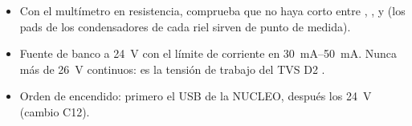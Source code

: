 \begin{ojo}
\begin{itemize}
  \item Con el multímetro en resistencia, comprueba que no haya corto entre , ,  y
   (los pads de los condensadores de cada riel sirven de punto de medida).
  \item Fuente de banco a \SI{24}{\volt} con el límite de corriente en \SIrange{30}{50}{\milli\ampere}. Nunca más de
  \SI{26}{\volt} continuos: es la tensión de trabajo del TVS D2 \copia.
  \item Orden de encendido: primero el USB de la NUCLEO, después los \SI{24}{\volt} (cambio C12).
\end{itemize}
\end{ojo}


